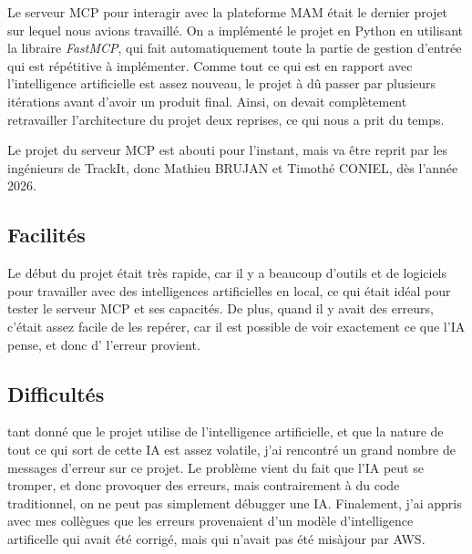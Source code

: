 \begin{flushleft}
  Le serveur MCP pour interagir avec la plateforme MAM
  était le dernier projet sur lequel nous avions travaillé.
  On a implémenté le projet en Python en utilisant la libraire
  \textit{FastMCP}, qui fait automatiquement toute la partie
  de gestion d'entrée qui est répétitive à implémenter.
  Comme tout ce qui est en rapport avec l'intelligence artificielle
  est assez nouveau, le projet à dû passer par plusieurs itérations
  avant d'avoir un produit final. Ainsi, on devait complètement
  retravailler l'architecture du projet deux reprises, ce qui nous
  a prit du temps.
\end{flushleft}

\begin{flushleft}
  Le projet du serveur MCP est abouti pour l'instant, mais va
  être reprit par les ingénieurs de TrackIt, donc Mathieu BRUJAN
  et Timothé CONIEL, dès l'année 2026.
\end{flushleft}

\subsection*{Facilités}

\begin{flushleft}
  Le début du projet était très rapide, car il y a beaucoup d'outils
  et de logiciels pour travailler avec des intelligences artificielles
  en local, ce qui était idéal pour tester le serveur MCP et ses
  capacités. De plus, quand il y avait des erreurs, c'était assez facile
  de les repérer, car il est possible de voir exactement ce que l'IA pense,
  et donc d'\scou{} l'erreur provient.
\end{flushleft}

\subsection*{Difficultés}

\begin{flushleft}
  \scemaj{}tant donné que le projet utilise de l'intelligence
  artificielle, et que la nature de tout ce qui sort de cette
  IA est assez volatile, j'ai rencontré un grand nombre de messages
  d'erreur sur ce projet. Le problème vient du fait que l'IA peut
  se tromper, et donc provoquer des erreurs, mais contrairement à
  du code traditionnel, on ne peut pas simplement débugger une IA.\@
  Finalement, j'ai appris avec mes collègues que les erreurs provenaient
  d'un modèle d'intelligence artificelle qui avait été corrigé, mais
  qui n'avait pas été mis\textendash{}à\textendash{}jour par AWS.\@
\end{flushleft}

